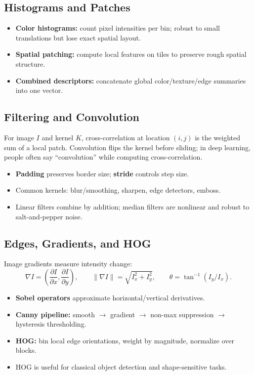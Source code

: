 \documentclass[10pt,twocolumn]{article}
\begin{document}
\subsection{Histograms and Patches}
\begin{itemize}
  \item \textbf{Color histograms:} count pixel intensities per bin; robust to small translations but lose exact spatial layout.
  \item \textbf{Spatial patching:} compute local features on tiles to preserve rough spatial structure.
  \item \textbf{Combined descriptors:} concatenate global color/texture/edge summaries into one vector.
\end{itemize}

\subsection{Filtering and Convolution}
For image $I$ and kernel $K$, cross-correlation at location $(i,j)$ is the weighted sum of a local patch. Convolution flips the kernel before sliding; in deep learning, people often say ``convolution'' while computing cross-correlation.
\begin{itemize}
  \item \textbf{Padding} preserves border size; \textbf{stride} controls step size.
  \item Common kernels: blur/smoothing, sharpen, edge detectors, emboss.
  \item Linear filters combine by addition; median filters are nonlinear and robust to salt-and-pepper noise.
\end{itemize}

\subsection{Edges, Gradients, and HOG}
Image gradients measure intensity change:
\[
\nabla I = \left(\frac{\partial I}{\partial x},\frac{\partial I}{\partial y}\right),
\qquad
\|\nabla I\|=\sqrt{I_x^2+I_y^2},
\qquad
\theta=\tan^{-1}(I_y/I_x).
\]
\begin{itemize}
  \item \textbf{Sobel operators} approximate horizontal/vertical derivatives.
  \item \textbf{Canny pipeline:} smooth $\to$ gradient $\to$ non-max suppression $\to$ hysteresis thresholding.
  \item \textbf{HOG:} bin local edge orientations, weight by magnitude, normalize over blocks.
  \item HOG is useful for classical object detection and shape-sensitive tasks.
\end{itemize}
\end{document}
